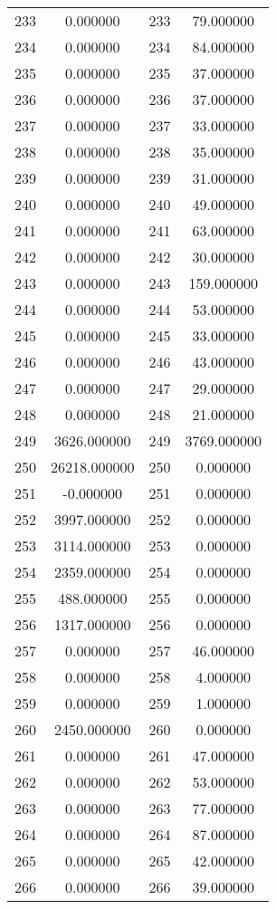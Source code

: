 \documentclass[12pt]{article}
\begin{document}
\begin{longtable}{@{}cccc@{}}
233 & 0.000000 & 233 & 79.000000 \\
234 & 0.000000 & 234 & 84.000000 \\
235 & 0.000000 & 235 & 37.000000 \\
236 & 0.000000 & 236 & 37.000000 \\
237 & 0.000000 & 237 & 33.000000 \\
238 & 0.000000 & 238 & 35.000000 \\
239 & 0.000000 & 239 & 31.000000 \\
240 & 0.000000 & 240 & 49.000000 \\
241 & 0.000000 & 241 & 63.000000 \\
242 & 0.000000 & 242 & 30.000000 \\
243 & 0.000000 & 243 & 159.000000 \\
244 & 0.000000 & 244 & 53.000000 \\
245 & 0.000000 & 245 & 33.000000 \\
246 & 0.000000 & 246 & 43.000000 \\
247 & 0.000000 & 247 & 29.000000 \\
248 & 0.000000 & 248 & 21.000000 \\
249 & 3626.000000 & 249 & 3769.000000 \\
250 & 26218.000000 & 250 & 0.000000 \\
251 & -0.000000 & 251 & 0.000000 \\
252 & 3997.000000 & 252 & 0.000000 \\
253 & 3114.000000 & 253 & 0.000000 \\
254 & 2359.000000 & 254 & 0.000000 \\
255 & 488.000000 & 255 & 0.000000 \\
256 & 1317.000000 & 256 & 0.000000 \\
257 & 0.000000 & 257 & 46.000000 \\
258 & 0.000000 & 258 & 4.000000 \\
259 & 0.000000 & 259 & 1.000000 \\
260 & 2450.000000 & 260 & 0.000000 \\
261 & 0.000000 & 261 & 47.000000 \\
262 & 0.000000 & 262 & 53.000000 \\
263 & 0.000000 & 263 & 77.000000 \\
264 & 0.000000 & 264 & 87.000000 \\
265 & 0.000000 & 265 & 42.000000 \\
266 & 0.000000 & 266 & 39.000000 \\

\end{longtable}
\end{document}
